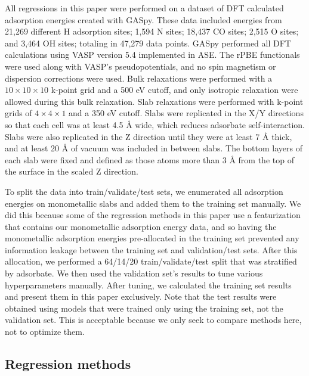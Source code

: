 \documentclass[]{achemso}
\begin{document}
All regressions in this paper were performed on a dataset of \gls{DFT} calculated adsorption energies created with \gls{GASpy}\cite{Tran2018, Tran2018a}.
These data included energies from 21,269 different H adsorption sites; 1,594 N sites; 18,437 CO sites; 2,515 O sites; and 3,464 OH sites; totaling in 47,279 data points.
\gls{GASpy} performed all \gls{DFT} calculations using \gls{VASP}\cite{Kresse1993, Kresse1994, Kresse1996, Kresse1996a} version 5.4 implemented in \gls{ASE}\cite{HjorthLarsen2017}.
The \gls{rPBE} functionals\cite{Hammer1999} were used along with \gls{VASP}'s pseudopotentials, and no spin magnetism or dispersion corrections were used.
Bulk relaxations were performed with a $10\times10\times10$ k-point grid and a 500 \gls{eV} cutoff, and only isotropic relaxation were allowed during this bulk relaxation.
Slab relaxations were performed with k-point grids of $4\times4\times1$ and a 350 \gls{eV} cutoff.
Slabs were replicated in the X/Y directions so that each cell was at least 4.5 \AA{} wide, which reduces adsorbate self-interaction.
Slabs were also replicated in the Z direction until they were at least 7 \AA{} thick, and at least 20 \AA{} of vacuum was included in between slabs.
The bottom layers of each slab were fixed and defined as those atoms more than 3 \AA{} from the top of the surface in the scaled Z direction.

To split the data into train/validate/test sets, we enumerated all adsorption energies on monometallic slabs and added them to the training set manually. 
We did this because some of the regression methods in this paper use a featurization that contains our monometallic adsorption energy data\cite{Tran2018}, and so having the monometallic adsorption energies pre-allocated in the training set prevented any information leakage between the training set and validation/test sets.
After this allocation, we performed a 64/14/20 train/validate/test split that was stratified\cite{Thompson2012} by adsorbate.
We then used the validation set's results to tune various hyperparameters manually.
After tuning, we calculated the training set results and present them in this paper exclusively.
Note that the test results were obtained using models that were trained only using the training set, not the validation set.
This is acceptable because we only seek to compare methods here, not to optimize them.


\subsection{Regression methods}
\end{document}
